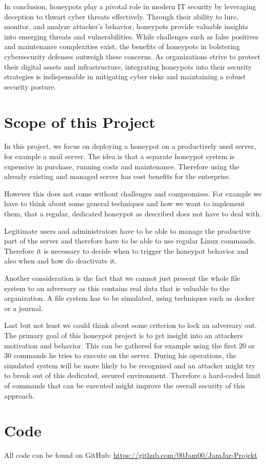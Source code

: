 In conclusion, honeypots play a pivotal role in modern IT security by leveraging deception to thwart cyber threats effectively. Through their ability to lure, monitor, and analyze attacker's behavior, honeypots provide valuable insights into emerging threats and vulnerabilities. While challenges such as false positives and maintenance complexities exist, the benefits of honeypots in bolstering cybersecurity defenses outweigh these concerns. As organizations strive to protect their digital assets and infrastructure, integrating honeypots into their security strategies is indispensable in mitigating cyber risks and maintaining a robust security posture.

\section{Scope of this Project}

In this project, we focus on deploying a honeypot on a productively used server, for example a mail server. The idea is that a separate honeypot system is expensive in purchase, running costs and maintenance. Therefore using the already existing and managed server has cost benefits for the enterprise.

However this does not come without challenges and compromises. For example we have to think about some general techniques and how we want to implement them, that a regular, dedicated honeypot as described does not have to deal with.

Legitimate users and administrators have to be able to manage the productive part of the server and therefore have to be able to use regular Linux commands. Therefore it is necessary to decide when to trigger the honeypot behavior and also when and how do deactivate it. 

Another consideration is the fact that we cannot just present the whole file system to an adversary as this contains real data that is valuable to the organization. A file system has to be simulated, using techniques such as docker or a journal. 

Last but not least we could think about some criterion to lock an adversary out. The primary goal of this honeypot project is to get insight into an attackers motivation and behavior. This can be gathered for example using the first 20 or 30 commands he tries to execute on the server. During his operations, the simulated system will be more likely to be recognized and an attacker might try to break out of this dedicated, secured environment. Therefore a hard-coded limit of commands that can be executed might improve the overall security of this approach.

\section{Code}

All code can be found on GitHub: \url{https://github.com/00Jam00/JamJar-Projekt}
